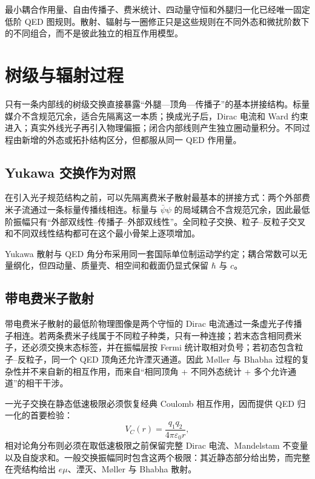 最小耦合作用量、自由传播子、费米统计、四动量守恒和外腿归一化已经唯一固定低阶 QED 图规则。散射、辐射与一圈修正只是这些规则在不同外态和微扰阶数下的不同组合，而不是彼此独立的相互作用模型。

\section{树级与辐射过程}

只有一条内部线的树级交换直接暴露“外腿—顶角—传播子”的基本拼接结构。标量媒介不含规范冗余，适合先隔离这一本质；换成光子后，Dirac 电流和 Ward 约束进入；真实外线光子再引入物理偏振；闭合内部线则产生独立圈动量积分。不同过程由新增的外态或拓扑结构区分，但都服从同一 QED 作用量。
\subsection{Yukawa 交换作为对照}

在引入光子规范结构之前，可以先隔离费米子散射最基本的拼接方式：两个外部费米子流通过一条标量传播线相连。标量与 $\bar\psi\psi$ 的局域耦合不含规范冗余，因此最低阶振幅只有“外部双线性--传播子--外部双线性”。全同粒子交换、粒子--反粒子交叉和不同双线性结构都可在这个最小骨架上逐项增加。




Yukawa 散射与 QED 角分布采用同一套国际单位制运动学约定；耦合常数可以无量纲化，但四动量、质量壳、相空间和截面仍显式保留 $\hbar$ 与 $c$。



\subsection{带电费米子散射}

带电费米子散射的最低阶物理图像是两个守恒的 Dirac 电流通过一条虚光子传播子相连。若两条费米子线属于不同粒子种类，只有一种连接；若末态含相同费米子，还必须交换末态标签，并在振幅层按 Fermi 统计取相对负号；若初态包含粒子--反粒子，同一个 QED 顶角还允许湮灭通道。因此 M{\o}ller 与 Bhabha 过程的复杂性并不来自新的相互作用，而来自“相同顶角 + 不同外态统计 + 多个允许通道”的相干干涉。

一光子交换在静态低速极限必须恢复经典 Coulomb 相互作用，因而提供 QED 归一化的首要检验：
\[
 V_C(r)=\frac{q_1q_2}{4\pi\varepsilon_0r},
\]
相对论角分布则必须在取低速极限之前保留完整 Dirac 电流、Mandelstam 不变量以及自旋求和。一般交换振幅同时包含这两个极限：其近静态部分给出势，而完整在壳结构给出 $e\mu$、湮灭、M{\o}ller 与 Bhabha 散射。


